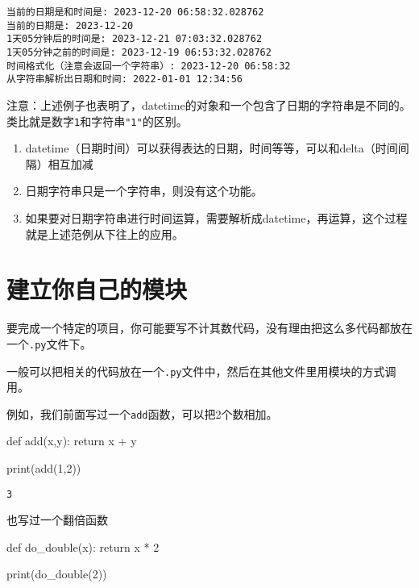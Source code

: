 \documentclass[
  letterpaper,
  DIV=11,
  numbers=noendperiod]{scrreprt}
\newenvironment{Shaded}{\begin{snugshade}}{\end{snugshade}}
\newcommand{\BuiltInTok}[1]{\textcolor[rgb]{0.00,0.23,0.31}{#1}}
\newcommand{\ControlFlowTok}[1]{\textcolor[rgb]{0.00,0.23,0.31}{#1}}
\newcommand{\DecValTok}[1]{\textcolor[rgb]{0.68,0.00,0.00}{#1}}
\newcommand{\KeywordTok}[1]{\textcolor[rgb]{0.00,0.23,0.31}{#1}}
\newcommand{\NormalTok}[1]{\textcolor[rgb]{0.00,0.23,0.31}{#1}}
\newcommand{\OperatorTok}[1]{\textcolor[rgb]{0.37,0.37,0.37}{#1}}
\providecommand{\tightlist}{%
  \setlength{\itemsep}{0pt}\setlength{\parskip}{0pt}}\usepackage{longtable,booktabs,array}
\begin{document}
\begin{verbatim}
当前的日期是和时间是: 2023-12-20 06:58:32.028762
当前的日期是: 2023-12-20
1天05分钟后的时间是: 2023-12-21 07:03:32.028762
1天05分钟之前的时间是: 2023-12-19 06:53:32.028762
时间格式化（注意会返回一个字符串）: 2023-12-20 06:58:32
从字符串解析出日期和时间: 2022-01-01 12:34:56
\end{verbatim}

注意：上述例子也表明了，datetime的对象和一个包含了日期的字符串是不同的。类比就是数字\texttt{1}和字符串\texttt{"1"}的区别。

\begin{enumerate}
\def\labelenumi{\arabic{enumi}.}
\tightlist
\item
  datetime（日期时间）可以获得表达的日期，时间等等，可以和delta（时间间隔）相互加减
\item
  日期字符串只是一个字符串，则没有这个功能。
\item
  如果要对日期字符串进行时间运算，需要解析成datetime，再运算，这个过程就是上述范例从下往上的应用。
\end{enumerate}

\hypertarget{ux5efaux7acbux4f60ux81eaux5df1ux7684ux6a21ux5757}{%
\section{建立你自己的模块}\label{ux5efaux7acbux4f60ux81eaux5df1ux7684ux6a21ux5757}}

要完成一个特定的项目，你可能要写不计其数代码，没有理由把这么多代码都放在一个\texttt{.py}文件下。

一般可以把相关的代码放在一个\texttt{.py}文件中，然后在其他文件里用模块的方式调用。

例如，我们前面写过一个\texttt{add}函数，可以把2个数相加。

\begin{Shaded}
\begin{Highlighting}[]
\KeywordTok{def}\NormalTok{ add(x,y):}
    \ControlFlowTok{return}\NormalTok{ x }\OperatorTok{+}\NormalTok{ y}

\BuiltInTok{print}\NormalTok{(add(}\DecValTok{1}\NormalTok{,}\DecValTok{2}\NormalTok{))}
\end{Highlighting}
\end{Shaded}

\begin{verbatim}
3
\end{verbatim}

也写过一个翻倍函数

\begin{Shaded}
\begin{Highlighting}[]
\KeywordTok{def}\NormalTok{ do\_double(x):}
    \ControlFlowTok{return}\NormalTok{ x }\OperatorTok{*} \DecValTok{2}

\BuiltInTok{print}\NormalTok{(do\_double(}\DecValTok{2}\NormalTok{))}
\end{Highlighting}
\end{Shaded}
\end{document}
